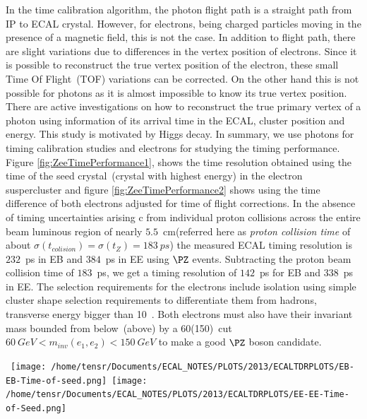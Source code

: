 In the time calibration algorithm, the photon flight path is a straight path from IP to ECAL crystal. However, for electrons, being charged particles moving in the presence of a magnetic field, this is not the case. In addition to flight path, there are slight variations due to differences in the vertex position of electrons. Since it is possible to reconstruct the true vertex position of the electron, these small Time Of Flight~(TOF) variations can be corrected. On the other hand this is not possible for photons as it is almost impossible to know its true vertex position. There are active investigations on how to reconstruct the true primary vertex of a photon using information of its arrival time in the ECAL, cluster position and energy. This study is motivated by Higgs decay. 
In summary, we use photons for timing calibration studies and electrons for studying the timing performance.
Figure \ref{fig:ZeeTimePerformance1}, shows the time resolution obtained using the time of the seed crystal~(crystal with highest energy) in the electron suspercluster and figure \ref{fig:ZeeTimePerformance2} shows using the time difference of both electrons adjusted for time of flight corrections. In the absence of timing uncertainties arising c from individual proton collisions across the entire beam luminous region of nearly $5.5$~cm(referred here as \textit{proton collision time} of about $\sigma(t_{colision}) = \sigma(t_{Z}) = 183~ps$) the measured ECAL timing resolution is $232$~ps in EB and $384$~ps in EE using $\PZ$ events. Subtracting the proton beam collision time of $183$~ps, we get a timing resolution of  $142$~ps for EB and $338$~ps in EE.
The selection requirements for the electrons include isolation using simple cluster shape  selection requirements to differentiate them from hadrons, transverse energy bigger than 10~\GeV. Both electrons must also have their invariant mass bounded from below~(above) by a 60(150)~\GeV cut \ie $ 60~GeV < m_{inv}(e_{1},e_{2}) < 150~ GeV$ to make a good $\PZ$ boson candidate. 


\begin{center}
\centering
\mbox{
\texttt{[image: /home/tensr/Documents/ECAL\_NOTES/PLOTS/2013/ECALTDRPLOTS/EB-EB-Time-of-seed.png]}\quad
\texttt{[image: /home/tensr/Documents/ECAL\_NOTES/PLOTS/2013/ECALTDRPLOTS/EE-EE-Time-of-Seed.png]}}
\label{fig:ZeeTimePerformance1}
\end{center}

